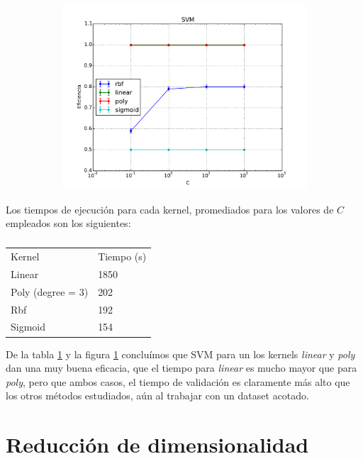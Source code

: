 \documentclass[a4paper,10pt]{article}
\begin{document}
\begin{figure}[H]
  \centering
  \begin{subfigure}[b]{0.4\textwidth}
    \includegraphics[width=\textwidth]{../imagenes/SVM}
     \caption{}
  \end{subfigure}
  \label{fig:svm}
\end{figure}

\par Los tiempos de ejecución para cada kernel, promediados para los valores de $C$ empleados son los siguientes:
\begin{table}[H]
\centering
\caption{}
\label{table:time_svm}
\begin{tabular}{ll}
Kernel & Tiempo (s) \\
Linear & 1850 \\
Poly (degree = 3) & 202 \\
Rbf & 192 \\
Sigmoid & 154 \\
\end{tabular}
\end{table}
De la tabla \ref{table:time_svm} y la figura \ref{fig:svm} concluímos que SVM para un los kernels \emph{linear} y \emph{poly} dan una muy buena eficacia, que el tiempo para \emph{linear} es mucho mayor que para \emph{poly}, pero que ambos casos, el tiempo de validación es claramente más alto que los otros métodos estudiados, aún al trabajar con un dataset acotado.


\section{Reducci\'on de dimensionalidad}
\end{document}
